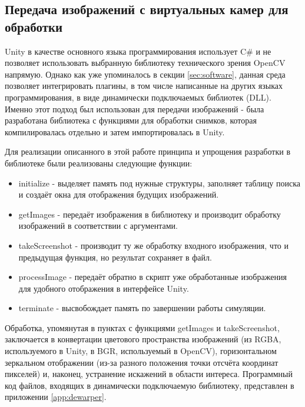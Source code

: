 \subsection{Передача изображений с виртуальных камер для обработки}
Unity в качестве основного языка программирования использует C\# и не позволяет использовать 
выбранную библиотеку технического зрения OpenCV напрямую. Однако как уже упоминалось в секции 
\ref{sec:software}, данная среда позволяет интегрировать плагины, в том числе написанные на 
других языках программирования, в виде динамически подключаемых библиотек (DLL). Именно этот 
подход был использован для передачи изображений - была разработана библиотека с функциями для 
обработки снимков, которая компилировалась отдельно и затем импортировалась в Unity. 

Для реализации описанного в этой работе принципа и упрощения разработки в библиотеке были реализованы 
следующие функции:
\begin{itemize}
    \item initialize - выделяет память под нужные структуры, заполняет таблицу поиска и создаёт окна 
    для отображения будущих изображений.
    \item getImages - передаёт изображения в библиотеку и производит обработку изображений в 
    соответствии с аргументами. 
    \item takeScreenshot - производит ту же обработку входного изображения, что и предыдущая функция,
     но результат сохраняет в файл. 
    \item processImage - передаёт обратно в скрипт уже обработанные изображения для удобного отображения
    в интерфейсе Unity. 
    \item terminate - высвобождает память по завершении работы симуляции.      
\end{itemize}
Обработка, упомянутая в пунктах с функциями getImages и takeScreenshot, заключается в конвертации 
цветового пространства изображений (из RGBA, используемого в Unity, в BGR, используемый в OpenCV), 
горизонтальном зеркальном отображении (из-за разного положения точки отсчёта координат пикселей)
и, наконец, устранение искажений в области интереса. Программный код файлов, входящих в динамически 
подключаемую библиотеку, представлен в приложении \ref{app:dewarper}.


